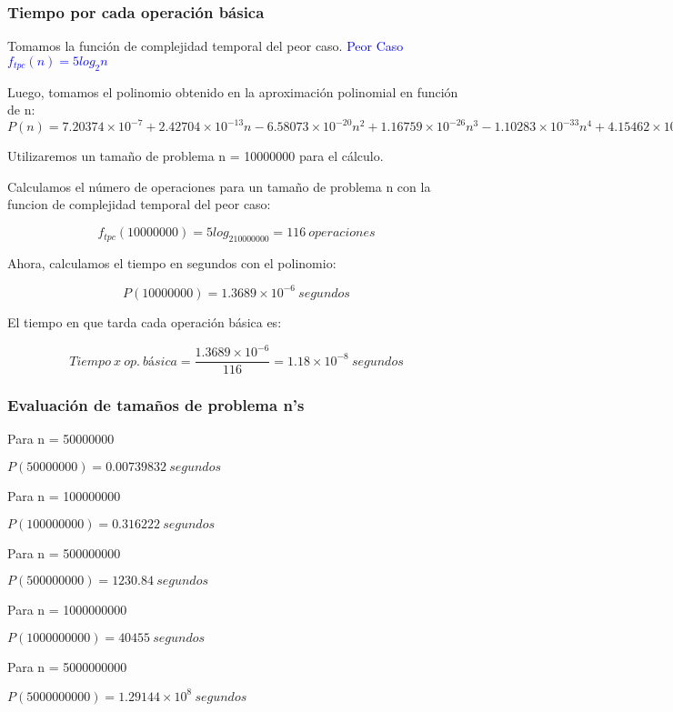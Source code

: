 \documentclass[12pt]{article}
\begin{document}
			\subsubsection{Tiempo por cada operación básica}
    			Tomamos la función de complejidad temporal del peor caso. \textcolor{blue}{ Peor Caso $f_{tpc}(n) = 5log_2n$}
    			
    			Luego, tomamos el polinomio obtenido en la aproximación polinomial en función de n: $P(n) = 7.20374\times10^{-7} + 2.42704\times10^{-13} n - 6.58073\times10^{-20} n^2 + 
    			1.16759\times10^{-26} n^3 - 1.10283\times10^{-33} n^4 + 4.15462\times10^{-41} n^5$
    			
    			Utilizaremos un tamaño de problema n = 10000000 para el cálculo.
    			
    			Calculamos el número de operaciones para un tamaño de problema n con la funcion de complejidad temporal del peor caso:
    			
    			$$f_{tpc}(10000000) = 5log_210000000 = 116~operaciones$$
    			
    			Ahora, calculamos el tiempo en segundos con el polinomio:
    			
    			$$P(10000000) = 1.3689\times10^{-6}~ segundos$$
    			
    			El tiempo en que tarda cada operación básica es:
    			
    			$$Tiempo~x~op.~básica = \frac{1.3689\times10^{-6}}{116} = 1.18\times10^{-8}~segundos$$
    			
    			\subsubsection{Evaluación de tamaños de problema n's}
    			Para n = 50000000
    			
                $P(50000000) = 0.00739832~ segundos$
    
    			Para n = 100000000
    			
    			$P(100000000) = 0.316222~ segundos$
    			
    			Para n = 500000000
    			
    			$P(500000000) = 1230.84~ segundos$
    			
    			Para n = 1000000000
    			
    			$P(1000000000) = 40455~ segundos$
    			
    			Para n = 5000000000
    			
    			$P(5000000000) = 1.29144\times10^{8}~ segundos$
    			
\end{document}
